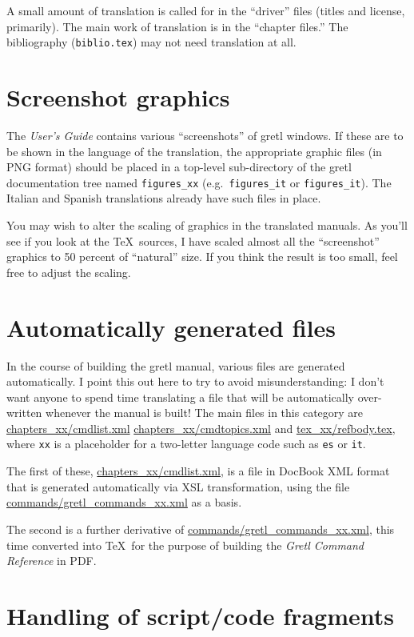 \documentclass{article}
\begin{document}
A small amount of translation is called for in the ``driver'' files
(titles and license, primarily).  The main work of translation is in
the ``chapter files.''  The bibliography (\texttt{biblio.tex}) may not
need translation at all.

\section{Screenshot graphics}

The \textit{User's Guide} contains various ``screenshots'' of
\textsf{gretl} windows.  If these are to be shown in the language of
the translation, the appropriate graphic files (in \textsf{PNG}
format) should be placed in a top-level sub-directory of the
\textsf{gretl} documentation tree named \texttt{figures\_xx} (e.g.\ 
\texttt{figures\_it} or \texttt{figures\_it}).  The Italian and
Spanish translations already have such files in place.

You may wish to alter the scaling of graphics in the translated
manuals.  As you'll see if you look at the \TeX\ sources, I have
scaled almost all the ``screenshot'' graphics to 50 percent of
``natural'' size.  If you think the result is too small, feel free to
adjust the scaling.


\section{Automatically generated files}

In the course of building the gretl manual, various files are
generated automatically.  I point this out here to try to avoid
misunderstanding: I don't want anyone to spend time translating a
file that will be automatically over-written whenever the manual is
built!  The main files in this category are
%
\url{chapters_xx/cmdlist.xml}
\url{chapters_xx/cmdtopics.xml}
%
and
%
\url{tex_xx/refbody.tex},
%
where \texttt{xx} is a placeholder for a two-letter language code
such as \texttt{es} or \texttt{it}.  

The first of these, \url{chapters_xx/cmdlist.xml}, is a file in
DocBook XML format that is generated automatically via XSL
transformation, using the file \url{commands/gretl_commands_xx.xml} as
a basis.  

The second is a further derivative of
\url{commands/gretl_commands_xx.xml}, this time converted into \TeX\ 
for the purpose of building the \textit{Gretl Command Reference} in
PDF.

\section{Handling of script/code fragments}
\end{document}
